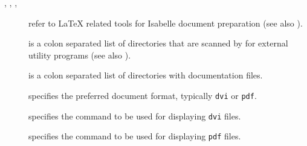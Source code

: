 \begin{isabellebody}
\begin{isamarkuptext}
\begin{description}
  \item[\hypertarget{setting.ISABELLE-LATEX}{\hyperlink{setting.ISABELLE-LATEX}{\mbox{}}}, \hypertarget{setting.ISABELLE-PDFLATEX}{\hyperlink{setting.ISABELLE-PDFLATEX}{\mbox{}}}, \hypertarget{setting.ISABELLE-BIBTEX}{\hyperlink{setting.ISABELLE-BIBTEX}{\mbox{}}}, \hypertarget{setting.ISABELLE-DVIPS}{\hyperlink{setting.ISABELLE-DVIPS}{\mbox{}}}] refer to {\LaTeX} related tools for Isabelle
  document preparation (see also ).
  
  \item[\hypertarget{setting.ISABELLE-TOOLS}{\hyperlink{setting.ISABELLE-TOOLS}{\mbox{}}}] is a colon separated list of
  directories that are scanned by \hyperlink{executable.isabelle}{\mbox{}} for external
  utility programs (see also ).
  
  \item[\hypertarget{setting.ISABELLE-DOCS}{\hyperlink{setting.ISABELLE-DOCS}{\mbox{}}}] is a colon separated list of
  directories with documentation files.
  
  \item[\hypertarget{setting.ISABELLE-DOC-FORMAT}{\hyperlink{setting.ISABELLE-DOC-FORMAT}{\mbox{}}}] specifies the preferred
  document format, typically \verb|dvi| or \verb|pdf|.
  
  \item[\hypertarget{setting.DVI-VIEWER}{\hyperlink{setting.DVI-VIEWER}{\mbox{}}}] specifies the command to be used
  for displaying \verb|dvi| files.
  
  \item[\hypertarget{setting.PDF-VIEWER}{\hyperlink{setting.PDF-VIEWER}{\mbox{}}}] specifies the command to be used
  for displaying \verb|pdf| files.
  

\end{description}
\end{isamarkuptext}
\end{isabellebody}
